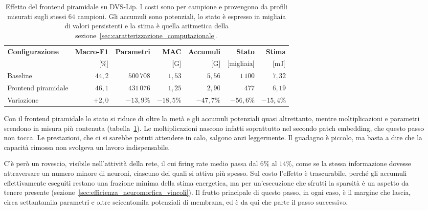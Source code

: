 \begin{table}[t]
\centering
\small
\renewcommand{\arraystretch}{1.2}
\caption[Effetto del frontend piramidale]{Effetto del frontend piramidale su DVS-Lip. I costi sono per campione e provengono da profili misurati sugli stessi 64 campioni. Gli accumuli sono potenziali, lo stato è espresso in migliaia di valori persistenti e la stima è quella aritmetica della sezione~\ref{sec:caratterizzazione_computazionale}.}
\label{tab:frontend_piramidale}
\begin{adjustbox}{max width=\textwidth}
\begin{tabular}{@{}l r r r r r r@{}}
\hline
\textbf{Configurazione} & \textbf{Macro-F1} & \textbf{Parametri} & \textbf{MAC} & \textbf{Accumuli} & \textbf{Stato} & \textbf{Stima} \\
 & [\%] & & [G] & [G] & [migliaia] & [mJ] \\
\hline
Baseline & $44{,}2$ & $500\,708$ & $1{,}53$ & $5{,}56$ & $1\,100$ & $7{,}32$ \\
Frontend piramidale & $46{,}1$ & $431\,076$ & $1{,}25$ & $2{,}90$ & $477$ & $6{,}19$ \\
\hline
Variazione & $+2{,}0$ & $-13{,}9\%$ & $-18{,}5\%$ & $-47{,}7\%$ & $-56{,}6\%$ & $-15{,}4\%$ \\
\hline
\end{tabular}
\end{adjustbox}
\end{table}

Con il frontend piramidale lo stato si riduce di oltre la metà e gli accumuli potenziali quasi altrettanto, mentre moltiplicazioni e parametri scendono in misura più contenuta (tabella~\ref{tab:frontend_piramidale}). Le moltiplicazioni nascono infatti soprattutto nel secondo patch embedding, che questo passo non tocca. Le prestazioni, che ci si sarebbe potuti attendere in calo, salgono anzi leggermente. Il guadagno è piccolo, ma basta a dire che la capacità rimossa non svolgeva un lavoro indispensabile.

C'è però un rovescio, visibile nell'attività della rete, il cui firing rate medio passa dal $6\%$ al $14\%$, come se la stessa informazione dovesse attraversare un numero minore di neuroni, ciascuno dei quali si attiva più spesso. Sul costo l'effetto è trascurabile, perché gli accumuli effettivamente eseguiti restano una frazione minima della stima energetica, ma per un'esecuzione che sfrutti la sparsità è un aspetto da tenere presente (sezione~\ref{sec:efficienza_neuromorfica_vincoli}). Il frutto principale di questo passo, in ogni caso, è il margine che lascia, circa settantamila parametri e oltre seicentomila potenziali di membrana, ed è da qui che parte il passo successivo.

